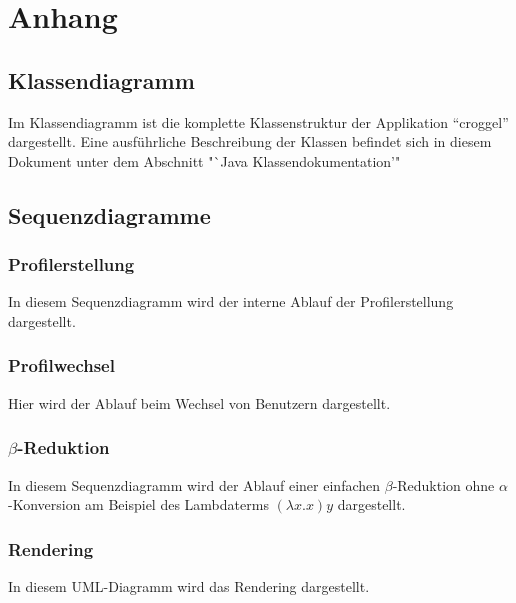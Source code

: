 \chapter{Anhang}
\section{Klassendiagramm}
	Im Klassendiagramm ist die komplette Klassenstruktur der Applikation "`croggel"' dargestellt. 
	Eine ausführliche Beschreibung der Klassen befindet sich in diesem Dokument unter dem Abschnitt "`Java Klassendokumentation'" 

\section{Sequenzdiagramme}
	\subsection{Profilerstellung}
		In diesem Sequenzdiagramm wird der interne Ablauf der Profilerstellung dargestellt.

	\subsection{Profilwechsel}
		Hier wird der Ablauf beim Wechsel von Benutzern dargestellt.

	\subsection{\(\beta\)-Reduktion}
		In diesem Sequenzdiagramm wird der Ablauf einer einfachen \(\beta\)-Reduktion ohne \(\alpha\)-Konversion am Beispiel des Lambdaterms \((\lambda x.x) y\) dargestellt.

	\subsection{Rendering}
		In diesem UML-Diagramm wird das Rendering dargestellt.

